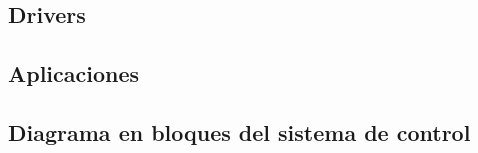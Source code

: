 \subsection{Drivers}

\subsection{Aplicaciones}

\subsection{Diagrama en bloques del sistema de control}